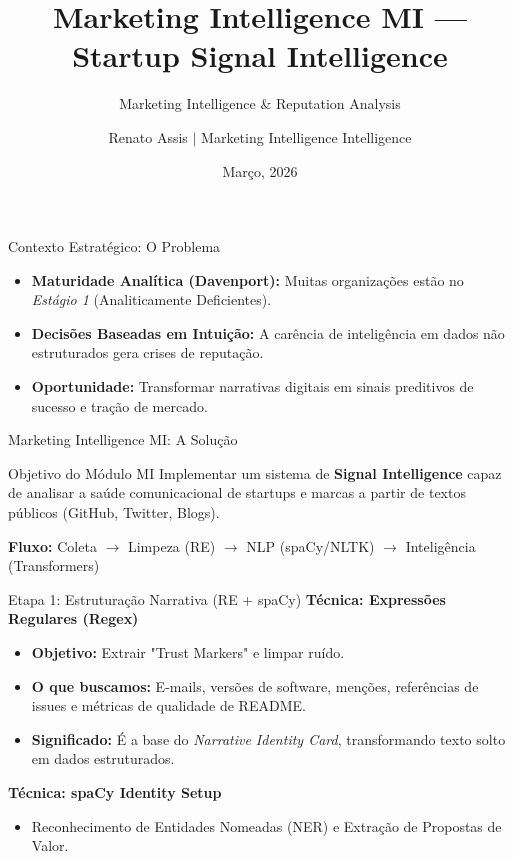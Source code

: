 \documentclass[12pt, aspectratio=169]{beamer}
\title{Marketing Intelligence MI --- Startup Signal Intelligence}
\subtitle{Marketing Intelligence \& Reputation Analysis}
\author{Renato Assis $|$ Marketing Intelligence Intelligence}
\institute{Brasil --- UFPB (Data Science for Business)}
\date{Março, 2026}
\begin{document}
\begin{frame}
  \titlepage
\end{frame}

\begin{frame}{Contexto Estratégico: O Problema}
  \begin{itemize}
    \item \textbf{Maturidade Analítica (Davenport):} Muitas organizações estão no \textit{Estágio 1} (Analiticamente Deficientes).
    \item \textbf{Decisões Baseadas em Intuição:} A carência de inteligência em dados não estruturados gera crises de reputação.
    \item \textbf{Oportunidade:} Transformar narrativas digitais em sinais preditivos de sucesso e tração de mercado.
  \end{itemize}
\end{frame}

\begin{frame}{Marketing Intelligence MI: A Solução}
  \begin{block}{Objetivo do Módulo MI}
    Implementar um sistema de \textbf{Signal Intelligence} capaz de analisar a saúde comunicacional de startups e marcas a partir de textos públicos (GitHub, Twitter, Blogs).
  \end{block}
  \vspace{0.3cm}
  \centering
  \textbf{Fluxo:} Coleta $\rightarrow$ Limpeza (RE) $\rightarrow$ NLP (spaCy/NLTK) $\rightarrow$ Inteligência (Transformers)
\end{frame}

\begin{frame}{Etapa 1: Estruturação Narrativa (RE + spaCy)}
  \textbf{Técnica: Expressões Regulares (Regex)}
  \begin{itemize}
    \item \textbf{Objetivo:} Extrair "Trust Markers" e limpar ruído.
    \item \textbf{O que buscamos:} E-mails, versões de software, menções, referências de issues e métricas de qualidade de README.
    \item \textbf{Significado:} É a base do \textit{Narrative Identity Card}, transformando texto solto em dados estruturados.
  \end{itemize}
  \vspace{0.2cm}
  \textbf{Técnica: spaCy Identity Setup}
  \begin{itemize}
    \item Reconhecimento de Entidades Nomeadas (NER) e Extração de Propostas de Valor.
  \end{itemize}
\end{frame}
\end{document}
